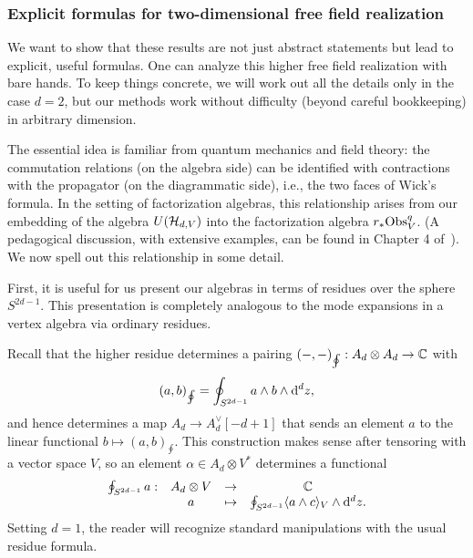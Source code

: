 \subsubsection{Explicit formulas for two-dimensional free field realization}

We want to show that these results are not just abstract statements but lead to explicit, useful formulas.
One can analyze this higher free field realization with bare hands.
To keep things concrete, we will work out all the details only in the case $d=2$, but our methods work without difficulty (beyond careful bookkeeping) in arbitrary dimension.


The essential idea is familiar from quantum mechanics and field theory:
the commutation relations (on the algebra side) can be identified with contractions with the propagator (on the diagrammatic side),
i.e., the two faces of Wick's formula.
In the setting of factorization algebras,
this relationship arises from our embedding of the algebra $U(\mathcal H_{d,V})$ into the factorization algebra $r_* {\rm Obs}^q_V$.
(A pedagogical discussion, with extensive examples, can be found in Chapter 4 of~\cite{CG}).
We now spell out this relationship in some detail.

First, it is useful for us present our algebras in terms of residues over the sphere $S^{2d-1}$. 
This presentation is completely analogous to the mode expansions in a vertex algebra via ordinary residues.

Recall that the higher residue determines a pairing $(-,-)_{\oint}: A_d \otimes A_d \to   \mathbb C$ with
\[
(a, b)_{\oint} = \oint_{S^{2d-1}} a \wedge b \wedge {\rm d}^d z ,
\]
and hence determines a map $A_d \to A_d^\vee [-d + 1]$ that sends an element $a$ to the linear functional $b \mapsto (a, b)_{\oint}$.
This construction makes sense after tensoring with a vector space $V$,
so an element $\alpha \in A_d \otimes V^*$ determines a functional 
\[
\begin{array}{cccc}
\oint_{S^{2d-1}} a  : & A_d \otimes V & \to & \mathbb C \\
& a & \mapsto & \oint_{S^{2d-1}} \langle a \wedge c\rangle_V \wedge {\rm d}^d z .
\end{array}
\]
Setting $d=1$, the reader will recognize standard manipulations with the usual residue formula.

